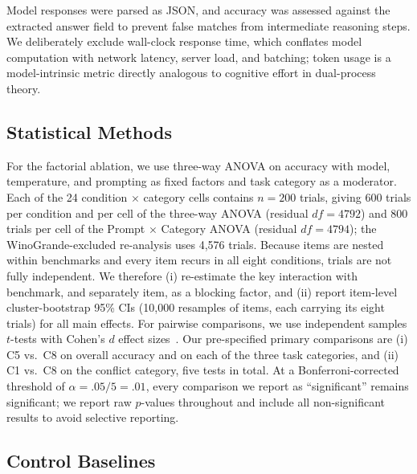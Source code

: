 \documentclass[conference]{IEEEtran}
\begin{document}
Model responses were parsed as JSON, and accuracy was assessed against the extracted answer field to prevent false matches from intermediate reasoning steps. We deliberately exclude wall-clock response time, which conflates model computation with network latency, server load, and batching; token usage is a model-intrinsic metric directly analogous to cognitive effort in dual-process theory.

\subsection{Statistical Methods}

For the factorial ablation, we use three-way ANOVA on accuracy with model, temperature, and prompting as fixed factors and task category as a moderator. Each of the 24 condition $\times$ category cells contains $n = 200$ trials, giving 600 trials per condition and per cell of the three-way ANOVA (residual $df = 4792$) and 800 trials per cell of the Prompt $\times$ Category ANOVA (residual $df = 4794$); the WinoGrande-excluded re-analysis uses 4{,}576 trials. Because items are nested within benchmarks and every item recurs in all eight conditions, trials are not fully independent. We therefore (i) re-estimate the key interaction with benchmark, and separately item, as a blocking factor, and (ii) report item-level cluster-bootstrap 95\% CIs (10{,}000 resamples of items, each carrying its eight trials) for all main effects. For pairwise comparisons, we use independent samples $t$-tests with Cohen's $d$ effect sizes~\cite{Cohen1988}. Our pre-specified primary comparisons are (i) C5 vs.\ C8 on overall accuracy and on each of the three task categories, and (ii) C1 vs.\ C8 on the conflict category, five tests in total. At a Bonferroni-corrected threshold of $\alpha = .05 / 5 = .01$, every comparison we report as ``significant'' remains significant; we report raw $p$-values throughout and include all non-significant results to avoid selective reporting.

\subsection{Control Baselines}
\end{document}
